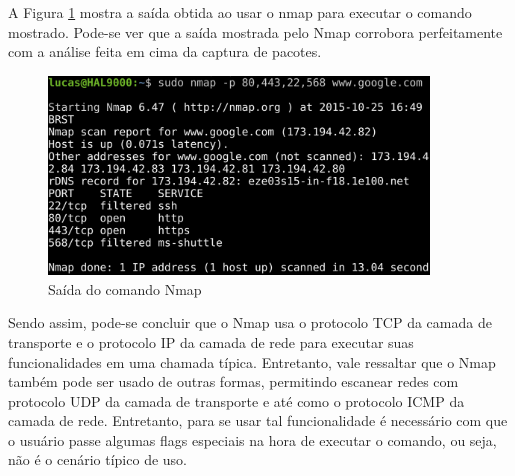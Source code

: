 A Figura \ref{fig:saida_nmap} mostra a saída obtida ao usar o nmap para executar o comando mostrado. Pode-se ver que a saída mostrada pelo Nmap corrobora
perfeitamente com a análise feita em cima da captura de pacotes.

\begin{figure}[h]
  \centering
  \includegraphics[width=0.9\textwidth]{figuras/saida_nmap.eps}
  \caption{Saída do comando Nmap}
  \label{fig:saida_nmap}
\end{figure}


Sendo assim, pode-se concluir que o Nmap usa o protocolo TCP da camada de transporte e o protocolo IP da camada de rede para executar suas funcionalidades
em uma chamada típica. Entretanto, vale ressaltar que o Nmap também pode ser usado de outras formas, permitindo escanear redes com protocolo UDP da camada de transporte
e até como o protocolo ICMP da camada de rede. Entretanto, para se usar tal funcionalidade é necessário com que o usuário passe algumas flags especiais na hora
de executar o comando, ou seja, não é o cenário típico de uso.
